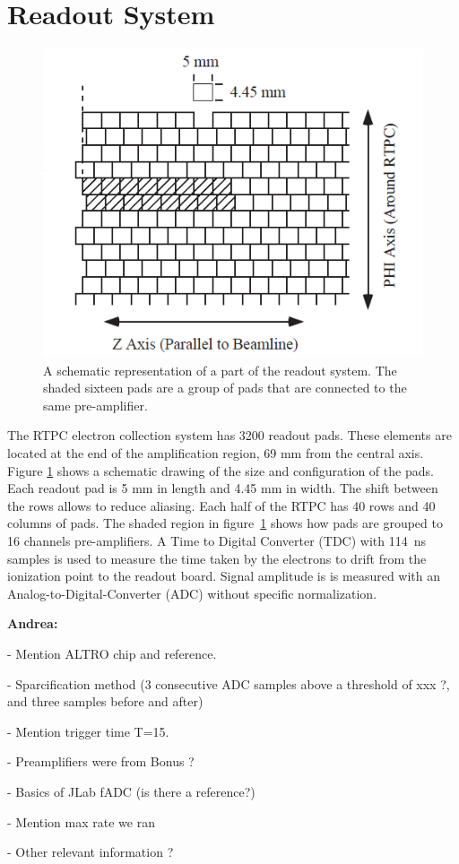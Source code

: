 \documentclass[twocolumn,showpacs,superscriptaddress,groupedaddress]{revtex4}
\begin{document}
\section{Readout System} \label{sec_readout}

\begin{figure}[tb]
   \centering
   \includegraphics[scale=0.55]{fig/PADs.png}
   \caption[]{A schematic representation of a part of the readout system.  The 
   shaded sixteen pads are a group of pads that are connected to the same 
pre-amplifier.} \label{fig:PADs}
\end{figure}

The RTPC electron collection system has 3200 readout pads. These elements are
located at the end of the amplification region, 69 mm from the central axis.
Figure \ref{fig:PADs} shows a schematic drawing of the size and 
configuration of the pads. Each readout pad is 5 mm in length and 4.45 mm in 
width.  The shift between the rows allows to reduce aliasing. Each half of the 
RTPC has 40 rows and 40 columns of pads. The shaded region in figure~\ref{fig:PADs}
shows how pads are grouped to 16 channels pre-amplifiers.  A Time to Digital
Converter (TDC) with 114~ns samples is used to measure the time taken by
the electrons to drift from the ionization point to the readout board.  Signal
amplitude is is measured with an Analog-to-Digital-Converter (ADC) without
specific normalization. 

{\bf \color{red} 
Andrea:

- Mention ALTRO chip and reference.

- Sparcification method (3 consecutive ADC samples above a threshold of xxx ?, and three
samples before and after) 

- Mention trigger time T=15.

- Preamplifiers were from Bonus ?

- Basics of JLab fADC (is there a reference?)

- Mention max rate we ran 

- Other relevant information ?
}
\end{document}
